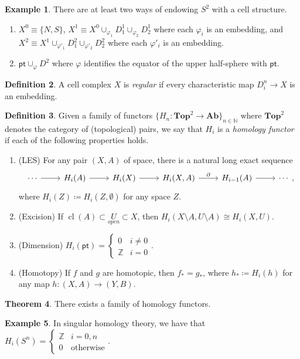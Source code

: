\documentclass[10pt,letterpaper,cm]{nupset}
\theoremstyle{definition}
\newtheorem{defn}{Definition}[subsection]
\newtheorem{exmp}[defn]{Example}
\theoremstyle{theorem}
\newtheorem{theorem}[defn]{Theorem}
\theoremstyle{remark}
\newcommand{\N}{\mathbb N}
\newcommand{\Z}{\mathbb Z}
\newcommand{\1}{\mathbb{1}}
\newcommand{\0}{\vec 0}
\newcommand{\pt}{\mathsf{pt}}
\DeclareMathOperator{\cl}{cl}
\newcommand{\be}{\begin{enumerate}}
\newcommand{\ee}{\end{enumerate}}
\begin{document}
\begin{exmp} There are at least two ways of endowing $S^2$ with a cell structure.
\be
\item $X^0 \equiv \{N, S\}$, $X^1 \equiv X^0 \cup_{\varphi_1} D_1^1 \cup_{\varphi_2} D_2^1$ where each $\varphi_i$ is an embedding, and $X^2 \equiv X^1  \cup_{\varphi'_1} D_1^2 \cup_{\varphi'_2} D_2^2$ where each $\varphi'_i$ is an embedding. 
\item $\pt \cup_{\varphi} D^2$ where $\varphi$ identifies the equator of the upper half-sphere with $\pt$.
\ee
\end{exmp}

\begin{defn}
A cell complex $X$ is \textit{regular} if every characteristic map $D_i^n \to X$ is an embedding. 
\end{defn}

\begin{defn}
Given a family of functors $\{H_n : \mathbf{Top}^2 \to \mathbf{Ab}\}_{n\in \N}$ where $\mathbf{Top}^2$ denotes the category of (topological) pairs, we say that $H_i$ is a \textit{homology functor} if  each of the following properties holds.
\be
\item (LES) For any pair $(X, A)$ of space, there is a natural long exact sequence
\[
\begin{tikzcd}
\cdots \arrow[r] & H_i(A)  \arrow[r] & H_i(X) \arrow[r] & {H_i(X, A)} \arrow[r, "\partial"] & H_{i-1}(A) \arrow[r] & \cdots
\end{tikzcd},
\] where $H_i(Z) \coloneqq H_i(Z, \emptyset)$ for any space $Z$.
\item (Excision) If $\cl(A) \subset \underset{open}{U} \subset X$, then $H_i(X\setminus A, U \setminus A) \cong H_i(X, U)$.
\item (Dimension) $H_i(\pt) = \begin{cases} 0 & i \ne 0 \\ \Z & i =0 \end{cases}$.
\item (Homotopy) If $f$ and $g$ are homotopic, then $f_{\ast} = g_{\ast}$, where $h_{\ast} \coloneqq H_i(h)$ for any map $h: (X,A) \to (Y, B)$. 
\ee
\end{defn}

\begin{theorem}
There exists a family of homology functors.
\end{theorem}

\begin{exmp}
In singular homology theory, we have that $H_i(S^n) = \begin{cases} \Z & i = 0, n \\ 0 & \text{otherwise} \end{cases}.$ 
\end{exmp}
\end{document}
